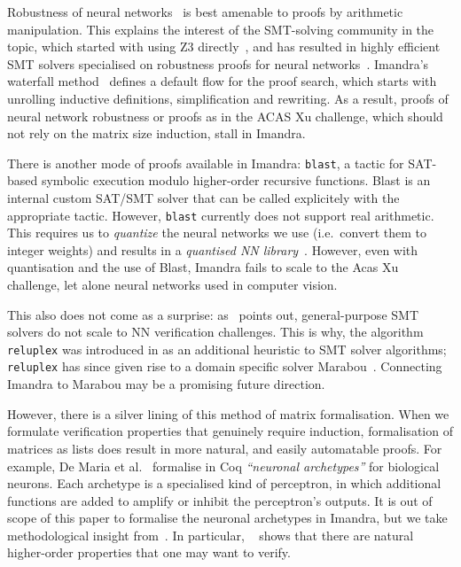 \documentclass[runningheads]{llncs}
\begin{document}
   Robustness of neural networks~\cite{CKDKKAE22} is best amenable to proofs by arithmetic manipulation. This explains the interest of the SMT-solving community in the topic, which started with using Z3 directly~\cite{HuangKWW17}, and has resulted in highly efficient SMT solvers specialised on robustness proofs for neural networks~\cite{KaBaDiJuKo17Reluplex,KatzHIJLLSTWZDK19}.   Imandra's waterfall method~\cite{PassmoreCIABKKM20} defines a default flow for the proof search, which starts with unrolling inductive definitions, simplification and rewriting.
  As a result, proofs of neural network robustness or proofs as in the ACAS Xu challenge, which should not rely on the matrix size induction,
  stall in Imandra.

  There is another mode of proofs available in Imandra:  \lstinline{blast}, a tactic for SAT-based symbolic execution modulo
 higher-order recursive functions. Blast is an internal custom SAT/SMT solver that can be called explicitely with the appropriate tactic.
 However, \lstinline{blast} currently does not support real arithmetic. This
 requires us to \emph{quantize} the neural networks we use (i.e.\ convert them to
 integer weights) and results in a \emph{quantised NN library}~\cite{DPKD22}.
 However, even with quantisation and the use of Blast, Imandra fails to scale to the Acas Xu challenge, let alone neural networks used in computer vision.

 This also does not come as a surprise: as~\cite{KaBaDiJuKo17Reluplex} points out, general-purpose SMT solvers do not scale to NN verification challenges.
This is why, the algorithm \lstinline{reluplex} was introduced in \cite{KaBaDiJuKo17Reluplex} as an additional heuristic to SMT solver algorithms;
\lstinline{reluplex} has since given rise to a domain specific solver Marabou~\cite{KatzHIJLLSTWZDK19}.
Connecting Imandra to Marabou may be a promising future direction. 

 However, there is a silver lining of this method of matrix formalisation.  When we formulate verification properties that genuinely require induction, formalisation of matrices as lists does result in more natural, and easily automatable proofs. For example, De Maria et al.~\cite{MariaBLFGRG22} formalise in Coq \emph{``neuronal
archetypes''} for biological neurons. Each archetype is a specialised kind of
perceptron, in which additional functions are added to amplify or inhibit the
perceptron's outputs. It is out of scope of this paper to formalise the neuronal
archetypes in Imandra, but we take methodological insight
from~\cite{MariaBLFGRG22}. In particular, ~\cite{MariaBLFGRG22} shows that there
are natural higher-order properties that one may want to verify.
\end{document}
